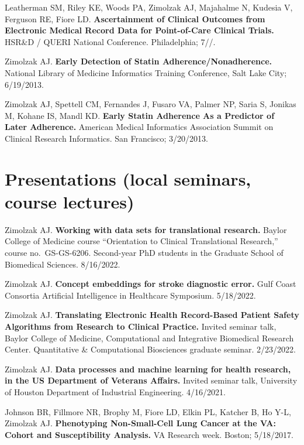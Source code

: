 \documentclass[10pt]{article}
\begin{document}
Leatherman SM, Riley KE, Woods PA, Zimolzak AJ, Majahalme N, Kudesia
V, Ferguson RE, Fiore LD. \textbf{Ascertainment of Clinical Outcomes
  from Electronic Medical Record Data for Point-of-Care Clinical
  Trials.} HSR\&D / QUERI National Conference. Philadelphia;
7/\ndash{}/.

Zimolzak AJ. \textbf{Early Detection of Statin
  Adherence/Nonadherence.} National Library of Medicine Informatics
Training Conference, Salt Lake City; 6/19/2013.

Zimolzak AJ, Spettell CM, Fernandes J, Fusaro VA, Palmer NP, Saria S,
Jonikas M, Kohane IS, Mandl KD. \textbf{Early Statin Adherence As a
  Predictor of Later Adherence.} American Medical Informatics
Association Summit on Clinical Research Informatics. San Francisco;
3/20/2013.




\section*{Presentations (local seminars, course lectures)} %

Zimolzak AJ. \textbf{Working with data sets for translational
  research.} Baylor College of Medicine course ``Orientation to
Clinical Translational Research,'' course no.\ GS-GS-6206. Second-year
PhD students in the Graduate School of Biomedical Sciences. 8/16/2022.

Zimolzak AJ. \textbf{Concept embeddings for stroke diagnostic error.}
Gulf Coast Consortia Artificial Intelligence in Healthcare Symposium.
5/18/2022.

Zimolzak AJ. \textbf{Translating Electronic Health Record-Based
  Patient Safety Algorithms from Research to Clinical Practice.}
Invited seminar talk, Baylor College of Medicine, Computational and
Integrative Biomedical Research Center. Quantitative \& Computational
Biosciences graduate seminar. 2/23/2022.

Zimolzak AJ. \textbf{Data processes and machine learning for health
  research, in the US Department of Veterans Affairs.} Invited seminar
talk, University of Houston Department of Industrial Engineering.
4/16/2021.

Johnson BR, Fillmore NR, Brophy M, Fiore LD, Elkin PL, Katcher B, Ho
Y-L, Zimolzak AJ. \textbf{Phenotyping Non-Small-Cell Lung Cancer at
  the VA: Cohort and Susceptibility Analysis.} VA Research week.
Boston; 5/18/2017.
\end{document}
